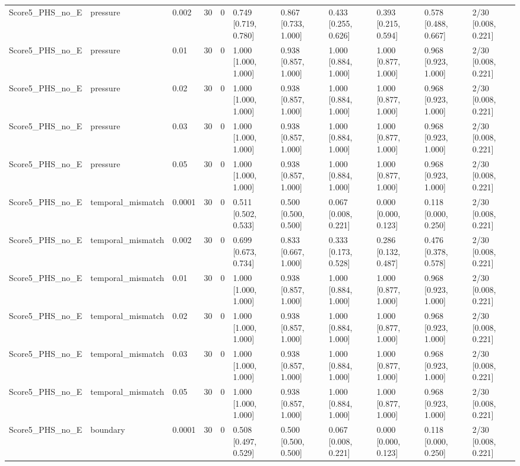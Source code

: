 \begin{longtable}{lllllllllll}
Score5\_PHS\_no\_E & pressure & 0.002 & 30 & 0 & 0.749 [0.719, 0.780] & 0.867 [0.733, 1.000] & 0.433 [0.255, 0.626] & 0.393 [0.215, 0.594] & 0.578 [0.488, 0.667] & 2/30 [0.008, 0.221] \\
Score5\_PHS\_no\_E & pressure & 0.01 & 30 & 0 & 1.000 [1.000, 1.000] & 0.938 [0.857, 1.000] & 1.000 [0.884, 1.000] & 1.000 [0.877, 1.000] & 0.968 [0.923, 1.000] & 2/30 [0.008, 0.221] \\
Score5\_PHS\_no\_E & pressure & 0.02 & 30 & 0 & 1.000 [1.000, 1.000] & 0.938 [0.857, 1.000] & 1.000 [0.884, 1.000] & 1.000 [0.877, 1.000] & 0.968 [0.923, 1.000] & 2/30 [0.008, 0.221] \\
Score5\_PHS\_no\_E & pressure & 0.03 & 30 & 0 & 1.000 [1.000, 1.000] & 0.938 [0.857, 1.000] & 1.000 [0.884, 1.000] & 1.000 [0.877, 1.000] & 0.968 [0.923, 1.000] & 2/30 [0.008, 0.221] \\
Score5\_PHS\_no\_E & pressure & 0.05 & 30 & 0 & 1.000 [1.000, 1.000] & 0.938 [0.857, 1.000] & 1.000 [0.884, 1.000] & 1.000 [0.877, 1.000] & 0.968 [0.923, 1.000] & 2/30 [0.008, 0.221] \\
Score5\_PHS\_no\_E & temporal\_mismatch & 0.0001 & 30 & 0 & 0.511 [0.502, 0.533] & 0.500 [0.500, 0.500] & 0.067 [0.008, 0.221] & 0.000 [0.000, 0.123] & 0.118 [0.000, 0.250] & 2/30 [0.008, 0.221] \\
Score5\_PHS\_no\_E & temporal\_mismatch & 0.002 & 30 & 0 & 0.699 [0.673, 0.734] & 0.833 [0.667, 1.000] & 0.333 [0.173, 0.528] & 0.286 [0.132, 0.487] & 0.476 [0.378, 0.578] & 2/30 [0.008, 0.221] \\
Score5\_PHS\_no\_E & temporal\_mismatch & 0.01 & 30 & 0 & 1.000 [1.000, 1.000] & 0.938 [0.857, 1.000] & 1.000 [0.884, 1.000] & 1.000 [0.877, 1.000] & 0.968 [0.923, 1.000] & 2/30 [0.008, 0.221] \\
Score5\_PHS\_no\_E & temporal\_mismatch & 0.02 & 30 & 0 & 1.000 [1.000, 1.000] & 0.938 [0.857, 1.000] & 1.000 [0.884, 1.000] & 1.000 [0.877, 1.000] & 0.968 [0.923, 1.000] & 2/30 [0.008, 0.221] \\
Score5\_PHS\_no\_E & temporal\_mismatch & 0.03 & 30 & 0 & 1.000 [1.000, 1.000] & 0.938 [0.857, 1.000] & 1.000 [0.884, 1.000] & 1.000 [0.877, 1.000] & 0.968 [0.923, 1.000] & 2/30 [0.008, 0.221] \\
Score5\_PHS\_no\_E & temporal\_mismatch & 0.05 & 30 & 0 & 1.000 [1.000, 1.000] & 0.938 [0.857, 1.000] & 1.000 [0.884, 1.000] & 1.000 [0.877, 1.000] & 0.968 [0.923, 1.000] & 2/30 [0.008, 0.221] \\
Score5\_PHS\_no\_E & boundary & 0.0001 & 30 & 0 & 0.508 [0.497, 0.529] & 0.500 [0.500, 0.500] & 0.067 [0.008, 0.221] & 0.000 [0.000, 0.123] & 0.118 [0.000, 0.250] & 2/30 [0.008, 0.221] \\

\end{longtable}

